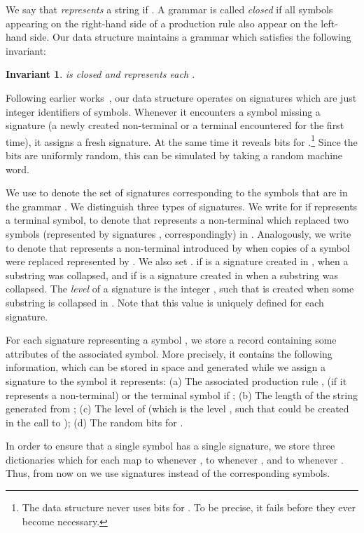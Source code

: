 \documentclass[a4paper]{article}
\newenvironment{shortv}{}{}
\newtheorem{invariant}[theorem]{Invariant}
\theoremstyle{remark}
\begin{document}
We say that  \emph{represents} a string  if .
A grammar  is called \emph{closed} if all symbols appearing on the right-hand side of a production rule
also appear on the left-hand side.
Our data structure maintains a grammar  which satisfies the following invariant:
\begin{invariant}\label{inv:consistency}
 is closed and represents each .
\end{invariant}


Following earlier works~\cite{Alstrup, Mehlhorn}, our data structure operates on signatures which are just integer identifiers of symbols.
Whenever it encounters a symbol  missing a signature (a newly created non-terminal or a terminal encountered for the first time), it assigns a fresh signature.
At the same time it reveals bits  for .\footnote{The data structure never uses bits  for . To be precise, it fails before they ever become necessary.}
Since the bits are uniformly random, this can be simulated by taking a random machine word.

We use  to denote the set of signatures corresponding to the symbols
that are in the grammar .
We distinguish three types of signatures.
We write  for  if  represents a terminal symbol,  to denote that  represents
a non-terminal  which replaced two symbols 
(represented by signatures , correspondingly)
in .
Analogously, we write
 to denote that  represents a non-terminal introduced by  when
 copies of a symbol  were replaced represented by .
We also set .
\begin{shortv}
 if  is a signature created in , when a substring   was collapsed,
and   if  is a signature created in  when a substring  was collapsed.
The \emph{level} of a signature  is the integer , such that  is created when some substring is collapsed in .
Note that this value is uniquely defined for each signature.
\end{shortv}

For each signature  representing a symbol ,
we store a record containing some attributes of the associated symbol.
More precisely, it contains the following information, which can be stored in  space
and generated while we assign a signature to the symbol it represents: (a) The associated production rule ,  (if it represents a non-terminal) or the terminal symbol  if ; (b) The length  of the string generated from ; (c) The level  of  (which is the level , such that  could be created in the call to ); (d) The random bits  for .

In order to ensure that a single symbol has a single signature,
we store three dictionaries which for each  map  to  whenever ,   to  whenever , and  to  whenever .
Thus, from now on we use signatures instead of the corresponding symbols.
\end{document}
